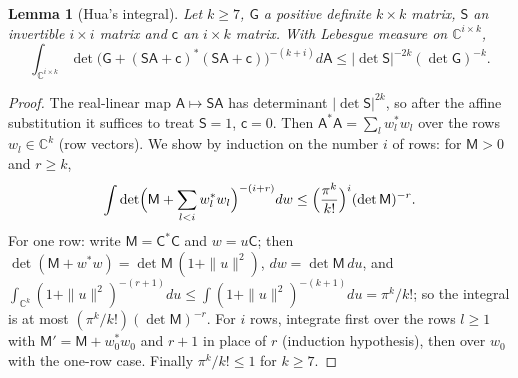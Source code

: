 \documentclass[10pt]{amsart}
\newtheorem{lemma}[theorem]{Lemma}
\theoremstyle{definition}
\theoremstyle{remark}
\newcommand{\C}{\mathbb C}
\begin{document}
\begin{lemma}[Hua's integral]\label{pbs:hua}
Let $k\ge7$, $\mathsf G$ a positive definite $k\times k$ matrix, $\mathsf S$ an invertible $i\times i$
matrix and $\mathsf c$ an $i\times k$ matrix. With Lebesgue measure on $\C^{i\times k}$,
\[
\int_{\C^{i\times k}}\det\bigl(\mathsf G+(\mathsf S\mathsf A+\mathsf c)^*(\mathsf S\mathsf A+\mathsf
c)\bigr)^{-(k+i)}d\mathsf A\le|\det\mathsf S|^{-2k}(\det\mathsf G)^{-k}.
\]
\end{lemma}
\begin{proof}
The real-linear map $\mathsf A\mapsto\mathsf S\mathsf A$ has determinant $|\det\mathsf S|^{2k}$, so after
the affine substitution it suffices to treat $\mathsf S=1$, $\mathsf c=0$. Then $\mathsf A^*\mathsf A=
\sum_l w_l^*w_l$ over the rows $w_l\in\C^k$ (row vectors). We show by induction on the number $i$ of
rows: for $\mathsf M>0$ and $r\ge k$,
\[
\int\det\Bigl(\mathsf M+\sum_{l<i}w_l^*w_l\Bigr)^{-(i+r)}dw\le\Bigl(\frac{\pi^k}{k!}\Bigr)^i(\det
\mathsf M)^{-r}.
\]
For one row: write $\mathsf M=\mathsf C^*\mathsf C$ and $w=u\mathsf C$; then $\det(\mathsf M+w^*w)=
\det\mathsf M\,(1+\|u\|^2)$, $dw=\det\mathsf M\,du$, and $\int_{\C^k}(1+\|u\|^2)^{-(r+1)}du\le\int(1+\|u\|^2)
^{-(k+1)}du=\pi^k/k!$; so the integral is at most $(\pi^k/k!)(\det\mathsf M)^{-r}$. For $i$ rows,
integrate first over the rows $l\ge1$ with $\mathsf M'=\mathsf M+w_0^*w_0$ and $r+1$ in place of $r$
(induction hypothesis), then over $w_0$ with the one-row case. Finally $\pi^k/k!\le1$ for $k\ge7$.
\end{proof}
\end{document}
